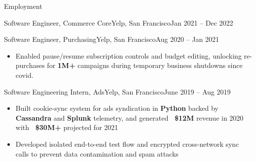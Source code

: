 \documentclass[]{mcdowellcv}
\begin{document}
\begin{cvsection}{Employment}
\begin{cvsubsection}{Software Engineer, Commerce Core}{Yelp, San Francisco}{Jan 2021 – Dec 2022}
\begin{itemize}
            \end{itemize}
		\end{cvsubsection}

            \begin{cvsubsection}{Software Engineer, Purchasing}{Yelp, San Francisco}{Aug 2020 – Jan 2021}
                    \begin{itemize}
                        \item Enabled pause/resume subscription controls and budget editing, unlocking re-purchases for \textbf{1M+} campaigns during temporary business shutdowns since covid.
                    \end{itemize}
            \end{cvsubsection}
            
            \begin{cvsubsection}{Software Engineering Intern, Ads}{Yelp, San Francisco}{June 2019 – Aug 2019}
                    \begin{itemize}
                        \item Built cookie-sync system for ads syndication in \textbf{Python} backed by \textbf{Cassandra} and \textbf{Splunk} telemetry, and generated \textbf{~\$12M} revenue in 2020 with \textbf{~\$30M+} projected for 2021
                        \item Developed isolated end-to-end test flow and encrypted cross-network sync calls to prevent data contamination and spam attacks

            \end{itemize}
		\end{cvsubsection}
	\end{cvsection}
\end{document}
